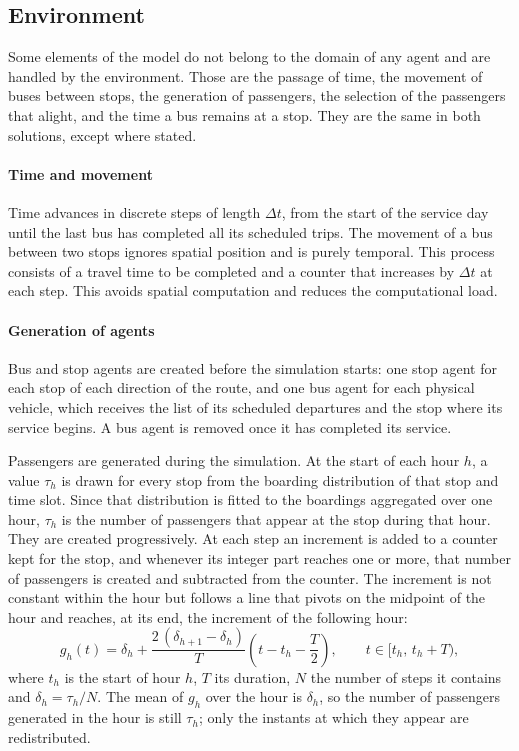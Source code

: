 \documentclass[a4paper,fleqn]{cas-sc}
\begin{document}
\subsection{Environment}\label{sec:environment}
 
Some elements of the model do not belong to the domain of any agent and are
handled by the environment. Those are the passage of time,
the movement of buses between stops, the generation of passengers, the
selection of the passengers that alight, and the time a bus remains at a stop.
They are the same in both solutions, except where stated.
 
\paragraph{Time and movement}

Time advances in discrete steps of length $\Delta t$, from the start of the
service day until the last bus has completed all its scheduled trips. The
movement of a bus between two stops ignores spatial position and is purely
temporal. This process consists of a travel time to be completed and a counter that
increases by $\Delta t$ at each step. This avoids spatial computation and
reduces the computational load.
 
\paragraph{Generation of agents}

Bus and stop agents are created before the simulation starts: one stop agent
for each stop of each direction of the route, and one bus agent for each
physical vehicle, which receives the list of its scheduled departures and the
stop where its service begins. A bus agent is removed once it has completed
its service.
 
Passengers are generated during the simulation. At the start of each hour $h$,
a value $\tau_h$ is drawn for every stop from the boarding distribution of that
stop and time slot. Since that distribution is fitted to the boardings
aggregated over one hour, $\tau_h$ is the number of passengers that appear at
the stop during that hour. They are created progressively. At each step an
increment is added to a counter kept for the stop, and whenever its integer
part reaches one or more, that number of passengers is created and subtracted
from the counter. The increment is not constant within the hour but follows a
line that pivots on the midpoint of the hour and reaches, at its end, the
increment of the following hour:
\begin{equation}\label{eq:generation}
g_h(t) = \delta_h + \frac{2\,(\delta_{h+1}-\delta_h)}{T}
         \left(t - t_h - \frac{T}{2}\right),
\qquad t \in [t_h,\, t_h + T),
\end{equation}
where $t_h$ is the start of hour $h$, $T$ its duration, $N$ the number of steps
it contains and $\delta_h = \tau_h / N$. The mean of $g_h$ over the hour is
$\delta_h$, so the number of passengers generated in the hour is still
$\tau_h$; only the instants at which they appear are redistributed.
\end{document}
